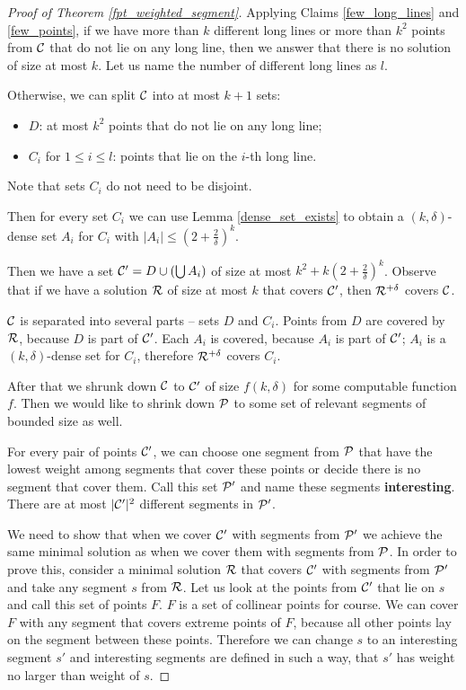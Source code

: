 \begin{proof}[Proof of Theorem \ref{fpt_weighted_segment}]

Applying Claims \ref{few_long_lines} and \ref{few_points},
if we have more than $k$ different long lines
or more than $k^2$ points from $\mathcal{C}$
that do not lie on any long line, then we answer that
there is no solution of size at most $k$.
Let us name the number of different long lines as $l$.

Otherwise, we can split $\mathcal{C}$ into at most $k+1$ sets:
\begin{itemize}
\item $D$: at most $k^2$ points that do not lie on any long line;
\item $C_i$ for $1 \le i \le l$: points that lie on the $i$-th long line.
\end{itemize}
Note that sets $C_i$ do not need to be disjoint.

Then for every set $C_i$ we can use Lemma \ref{dense_set_exists}
to obtain a $(k,\delta)$-dense set $A_i$
for $C_i$ with $|A_i| \le (2+\frac{2}{\delta})^k$.

Then we have a set $\mathcal{C}' = D \cup (\bigcup A_i)$ of size at most
$k^2 + k(2+\frac{2}{\delta})^k$.
Observe that if we have a solution $\mathcal{R}$ of size at most $k$
that covers $\mathcal{C}'$, then $\mathcal{R}^{+\delta}$ covers $\mathcal{C}$.

$\mathcal{C}$ is separated into several parts -- sets $D$ and $C_i$.
Points from $D$ are covered by $\mathcal{R}$, because $D$ is part of $\mathcal{C}'$.
Each $A_i$ is covered, because $A_i$ is part of $\mathcal{C}'$;
$A_i$ is a $(k,\delta)$-dense set for $C_i$, therefore $\mathcal{R}^{+\delta}$ covers $C_i$.

After that we shrunk down $\mathcal{C}$ to $\mathcal{C}'$ of size $f(k, \delta)$
for some computable function $f$.
Then we would like to shrink down $\mathcal{P}$ to some set of
relevant segments of bounded size as well.

For every pair of points $\mathcal{C}'$, we can choose one segment from
$\mathcal{P}$ that have the lowest weight
among segments that cover these points 
or decide there is no segment that cover them.
Call this set $\mathcal{P}'$ and name these segments \textbf{interesting}.
There are at most $|\mathcal{C}'|^2$ different segments in $\mathcal{P}'$.

We need to show that when we cover $\mathcal{C}'$
with segments from $\mathcal{P}'$ we achieve the same minimal
solution as when we cover them with segments from $\mathcal{P}$. 
In order to prove this,
consider a minimal solution $\mathcal{R}$ that covers $\mathcal{C}'$
with segments from $\mathcal{P}'$
and take any segment $s$ from $\mathcal{R}$.
Let us look at the points from $\mathcal{C}'$ that lie on $s$
and call this set of points $F$.
$F$ is a set of collinear points for course.
We can cover $F$ with any segment that covers extreme points of $F$,
because all other points lay on the segment between these points.
Therefore we can change $s$ to an interesting segment $s'$
and interesting segments are defined in such a way, that $s'$
has weight no larger than weight of $s$.


\end{proof}
